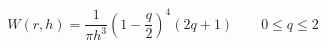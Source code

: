 \documentclass[12pt]{article}
\begin{document}
$$
  W\left( r,h \right) = \frac{1}{\pi h^3} \left( 1-\frac{q}{2} \right)^4 \left( 2q + 1 \right) \qquad 0 \leq q \leq 2
$$  
\end{document}
